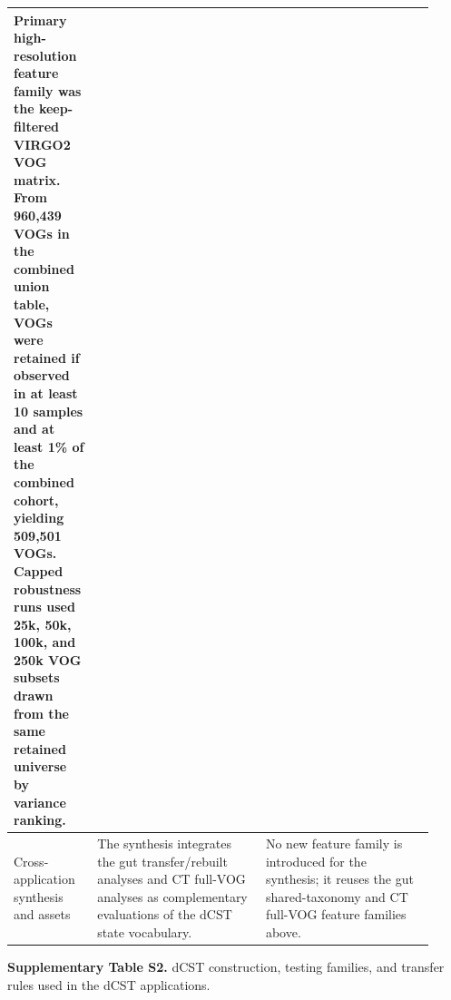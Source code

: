 \begin{landscape}
\begin{longtable}{p{0.16\linewidth}p{0.38\linewidth}p{0.38\linewidth}}
Primary high-resolution feature family was the keep-filtered VIRGO2 VOG matrix. From 960,439 VOGs in the combined union table, VOGs were retained if observed in at least 10 samples and at least 1\% of the combined cohort, yielding 509,501 VOGs. Capped robustness runs used 25k, 50k, 100k, and 250k VOG subsets drawn from the same retained universe by variance ranking. \\
\midrule
Cross-application synthesis and assets &
The synthesis integrates the gut transfer/rebuilt analyses and CT full-VOG analyses as complementary evaluations of the dCST state vocabulary. &
No new feature family is introduced for the synthesis; it reuses the gut shared-taxonomy and CT full-VOG feature families above. \\
\end{longtable}

\clearpage

\noindent\textbf{Supplementary Table S2.} dCST construction, testing families,
and transfer rules used in the dCST applications.


\end{landscape}
